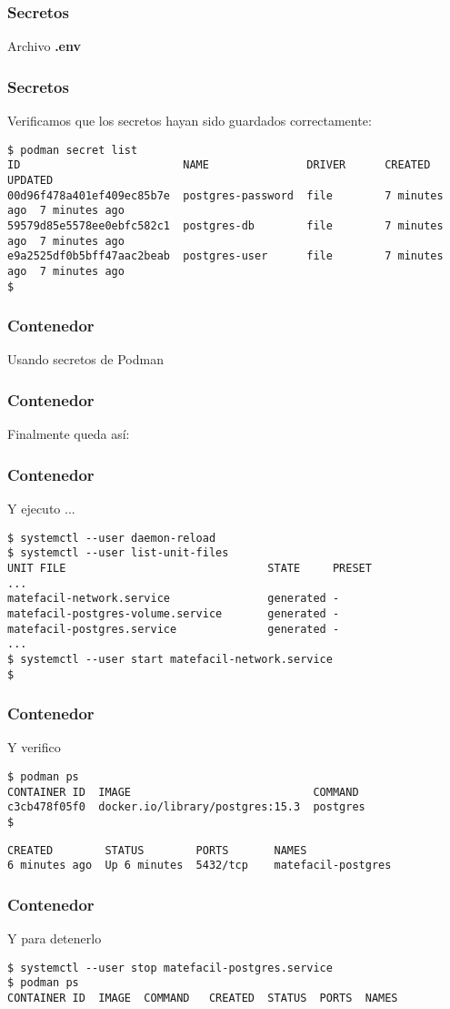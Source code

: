 \begin{frame}[fragile]
  \frametitle{Secretos}
  Archivo \textbf{.env}
  
\end{frame}

\begin{frame}[fragile]
  \frametitle{Secretos}
  Verificamos que los secretos hayan sido guardados correctamente:
  \begin{lstlisting}[basicstyle=\tiny]
$ podman secret list
ID                         NAME               DRIVER      CREATED        UPDATED
00d96f478a401ef409ec85b7e  postgres-password  file        7 minutes ago  7 minutes ago
59579d85e5578ee0ebfc582c1  postgres-db        file        7 minutes ago  7 minutes ago
e9a2525df0b5bff47aac2beab  postgres-user      file        7 minutes ago  7 minutes ago
$
  \end{lstlisting}
\end{frame}

\begin{frame}[fragile]
  \frametitle{Contenedor}
  Usando secretos de Podman
  
\end{frame}

\begin{frame}[fragile]
  \frametitle{Contenedor}
  Finalmente queda así:
  
\end{frame}

\begin{frame}[fragile]
  \frametitle{Contenedor}
  Y ejecuto ...
  \begin{lstlisting}
$ systemctl --user daemon-reload
$ systemctl --user list-unit-files
UNIT FILE                               STATE     PRESET
...
matefacil-network.service               generated -
matefacil-postgres-volume.service       generated -
matefacil-postgres.service              generated -
...
$ systemctl --user start matefacil-network.service
$
  \end{lstlisting}
\end{frame}

\begin{frame}[fragile]
  \frametitle{Contenedor}
  Y verifico
  \begin{lstlisting}
$ podman ps
CONTAINER ID  IMAGE                            COMMAND 
c3cb478f05f0  docker.io/library/postgres:15.3  postgres
$
  \end{lstlisting}
  \begin{lstlisting}
CREATED        STATUS        PORTS       NAMES
6 minutes ago  Up 6 minutes  5432/tcp    matefacil-postgres
  \end{lstlisting}
\end{frame}

\begin{frame}[fragile]
  \frametitle{Contenedor}
  Y para detenerlo
  \begin{lstlisting}
$ systemctl --user stop matefacil-postgres.service
$ podman ps
CONTAINER ID  IMAGE  COMMAND   CREATED  STATUS  PORTS  NAMES
  \end{lstlisting}
\end{frame}
